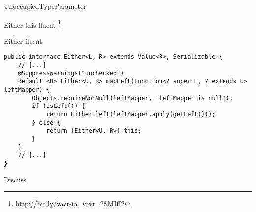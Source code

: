 \begin{pattern}{UnoccupiedTypeParameter}

\instances{}

Either this fluent \api{}
\footnote{\url{http://bit.ly/vavr-io_vavr_2SMIfI2}}

\begin{listing}[H]
\caption{Either fluent \api{}}
\begin{verbatim}
public interface Either<L, R> extends Value<R>, Serializable {
    // [...]
    @SuppressWarnings("unchecked")
    default <U> Either<U, R> mapLeft(Function<? super L, ? extends U> leftMapper) {
        Objects.requireNonNull(leftMapper, "leftMapper is null");
        if (isLeft()) {
            return Either.left(leftMapper.apply(getLeft()));
        } else {
            return (Either<U, R>) this;
        }
    }
    // [...]
}
\end{verbatim}
\end{listing}

\detection{}

\discussion{}

Discuss

\related{}

\end{pattern}